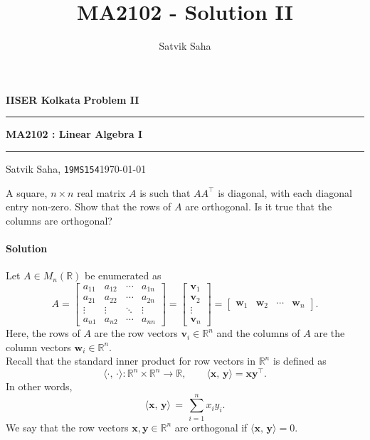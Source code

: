 \documentclass[10pt]{article}
\title{MA2102 - Solution II}
\author{Satvik Saha}
\date{}
\def\x{\bm{x}}
\def\y{\bm{y}}
\def\v{\bm{v}}
\def\w{\bm{w}}
\newcommand\ip[2]{\langle #1,\, #2 \rangle}
\begin{document}
        \par\textbf{IISER Kolkata} \hfill \textbf{Problem II}
        \vspace{3pt}
        \hrule
        \vspace{3pt}
        \begin{center}
                \LARGE{\textbf{MA2102 : Linear Algebra I}}
        \end{center}
        \vspace{3pt}
        \hrule
        \vspace{3pt}
        Satvik Saha, \texttt{19MS154}\hfill\today
        \vspace{20pt}

        A square, $n \times n$ real matrix $A$ is such that $A A^\top$ is diagonal, with each diagonal entry non-zero.
        Show that the rows of $A$ are orthogonal.
        Is it true that the columns are orthogonal? 
        
        \paragraph{Solution}
        Let $A \in M_n(\mathbb{R})$ be enumerated as 
        \[
                A = \begin{bmatrix}
                        a_{11} & a_{12} & \cdots & a_{1n} \\
                        a_{21} & a_{22} & \cdots & a_{2n} \\
                        \vdots & \vdots & \ddots & \vdots \\
                        a_{n1} & a_{n2} & \cdots & a_{nn}
                \end{bmatrix}
                = \begin{bmatrix}
                        \v_1 \\
                        \v_2 \\
                        \vdots \\
                        \v_n 
                \end{bmatrix}
                = \begin{bmatrix}
                        \w_1 & \w_2 & \cdots & \w_n
                \end{bmatrix}.
        \]
        Here, the rows of $A$ are the row vectors $\v_i \in \mathbb{R}^n$ and the columns of $A$ are the column vectors $\w_i \in \mathbb{R}^n$. \\

        Recall that the standard inner product for row vectors in $\mathbb{R}^n$ is defined as
        \[
                \ip{\cdot}{\cdot}\colon \mathbb{R}^n\times \mathbb{R}^n \to \mathbb{R}, \qquad \ip{\x}{\y} = \x\y^\top.
        \]
        In other words,
        \[
                \ip{\x}{\y} \,=\, \sum_{i = 1}^n x_i y_i.
        \]
        We say that the row vectors $\x, \y \in \mathbb{R}^n$ are orthogonal if $\ip{\x}{\y} = 0$.
\end{document}
